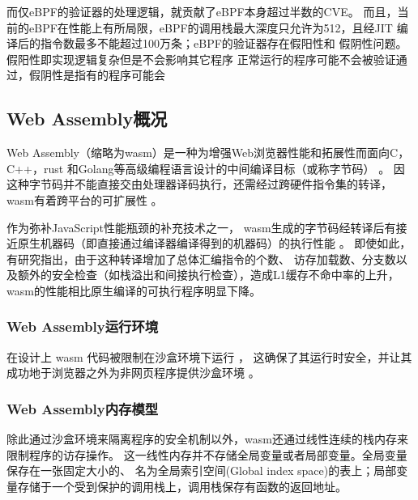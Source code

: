         而仅eBPF的验证器的处理逻辑，就贡献了eBPF本身超过半数的CVE\cite{hive}。
        而且，当前的eBPF在性能上有所局限，eBPF的调用栈最大深度只允许为512，且经JIT
        编译后的指令数最多不能超过100万条；eBPF的验证器存在假阳性\cite{hive}和
        假阴性问题\cite{RJXB202312023}。假阳性即实现逻辑复杂但是不会影响其它程序
        正常运行的程序可能不会被验证通过，假阴性是指有的程序可能会

\subsection{Web Assembly概况}
    Web Assembly（缩略为wasm）是一种为增强Web浏览器性能和拓展性而面向C，C++，rust
    和Golang等高级编程语言设计的中间编译目标（或称字节码）
    \cite{wasmCommunityGroup, lehmannWasabiFrameworkDynamically2019, 
        lehmannEverythingOldNew, bhansaliFirstLookCode2022, waseemIssuesTheirCauses2024}。
    因这种字节码并不能直接交由处理器译码执行，还需经过跨硬件指令集的转译，wasm有着跨平台的可扩展性
    \cite{lehmannEverythingOldNew, waseemIssuesTheirCauses2024, 
        lehmannWasabiFrameworkDynamically2019, JayProvablySafe, 
        WebAssemblySummaryOnSecurity, rayOverviewWebAssemblyIoT2023}。

    作为弥补JavaScript性能瓶颈的补充技术之一\cite{rayOverviewWebAssemblyIoT2023}，
    wasm生成的字节码经转译后有接近原生机器码（即直接通过编译器编译得到的机器码）的执行性能
    \cite{haasBringingWebSpeed2017,johnsonWaVeVerifiablySecure2023}。
    即使如此，有研究\cite{JangdaNotsoFast}指出，由于这种转译增加了总体汇编指令的个数、
    访存加载数、分支数以及额外的安全检查（如栈溢出和间接执行检查），造成L1缓存不命中率的上升，
    wasm的性能相比原生编译的可执行程序明显下降。

    \subsubsection{Web Assembly运行环境}
        在设计上 wasm 代码被限制在沙盒环境下运行
        \cite{johnsonWaVeVerifiablySecure2023,WasmbpfStreamliningEBPF2024}，
        这确保了其运行时安全，并让其成功地于浏览器之外为非网页程序提供沙盒环境
        \cite{narayanSwivelHardeningWebAssembly, WebAssemblySummaryOnSecurity, 9156135}。

    \subsubsection{Web Assembly内存模型}
        除此通过沙盒环境来隔离程序的安全机制以外，wasm还通过线性连续的栈内存来限制程序的访存操作。
        这一线性内存并不存储全局变量或者局部变量。全局变量保存在一张固定大小的、
        名为全局索引空间(Global index space)的表上；局部变量存储于一个受到保护的调用栈上，调用栈保存有函数的返回地址。

